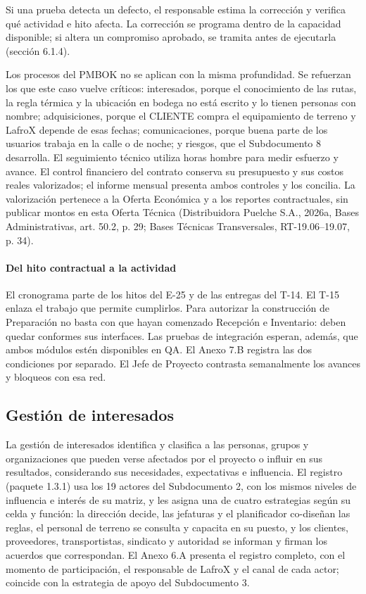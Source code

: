Si una prueba detecta un defecto, el responsable estima la corrección y verifica qué actividad e hito afecta. La corrección se programa dentro de la capacidad disponible; si altera un compromiso aprobado, se tramita antes de ejecutarla (sección 6.1.4).

Los procesos del PMBOK no se aplican con la misma profundidad. Se refuerzan los que este caso vuelve críticos: interesados, porque el conocimiento de las rutas, la regla térmica y la ubicación en bodega no está escrito y lo tienen personas con nombre; adquisiciones, porque el CLIENTE compra el equipamiento de terreno y LafroX depende de esas fechas; comunicaciones, porque buena parte de los usuarios trabaja en la calle o de noche; y riesgos, que el Subdocumento 8 desarrolla. El seguimiento técnico utiliza horas hombre para medir esfuerzo y avance. El control financiero del contrato conserva su presupuesto y sus costos reales valorizados; el informe mensual presenta ambos controles y los concilia. La valorización pertenece a la Oferta Económica y a los reportes contractuales, sin publicar montos en esta Oferta Técnica (Distribuidora Puelche S.A., 2026a, Bases Administrativas, art. 50.2, p. 29; Bases Técnicas Transversales, RT-19.06--19.07, p. 34).

\paragraph{Del hito contractual a la actividad}
El cronograma parte de los hitos del E-25 y de las entregas del T-14. El T-15 enlaza el trabajo que permite cumplirlos. Para autorizar la construcción de Preparación no basta con que hayan comenzado Recepción e Inventario: deben quedar conformes sus interfaces. Las pruebas de integración esperan, además, que ambos módulos estén disponibles en QA. El Anexo 7.B registra las dos condiciones por separado. El Jefe de Proyecto contrasta semanalmente los avances y bloqueos con esa red.

\subsection{Gestión de interesados}

La gestión de interesados identifica y clasifica a las personas, grupos y organizaciones que pueden verse afectados por el proyecto o influir en sus resultados, considerando sus necesidades, expectativas e influencia. El registro (paquete 1.3.1) usa los 19 actores del Subdocumento 2, con los mismos niveles de influencia e interés de su matriz, y les asigna una de cuatro estrategias según su celda y función: la dirección decide, las jefaturas y el planificador co-diseñan las reglas, el personal de terreno se consulta y capacita en su puesto, y los clientes, proveedores, transportistas, sindicato y autoridad se informan y firman los acuerdos que correspondan. El Anexo 6.A presenta el registro completo, con el momento de participación, el responsable de LafroX y el canal de cada actor; coincide con la estrategia de apoyo del Subdocumento 3.

